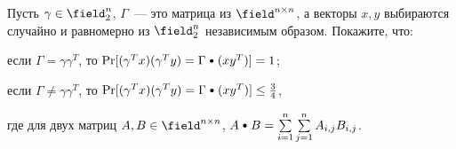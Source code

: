 Пусть $\gamma \in \field_2^n$, $\Gamma$~--- это матрица из $\field^{n \times n}$, а векторы $x, y$
выбираются случайно и равномерно из $\field_2^n$ независимым образом. Покажите, что:
\begin{enumcyr}
    \item если $\Gamma = \gamma \gamma^T$, то $\Pr[(\gamma^T x) (\gamma^T y) = \Gamma
        \raisebox{0.23ex}{\scriptsize $~\bullet$ } (x y^T)] = 1$;
    \item если $\Gamma \neq \gamma \gamma^T$, то $\Pr[(\gamma^T x) (\gamma^T y) = \Gamma
        \raisebox{0.23ex}{\scriptsize $~\bullet$ } (x y^T)] \le \frac{3}{4}$,
\end{enumcyr}
где для двух матриц $A, B \in \field^{n \times n}$,
$A \raisebox{0.23ex}{\scriptsize $~\bullet$ } B = \sum\limits_{i = 1}^n
\sum\limits_{j = 1}^n A_{i, j} B_{i, j}$.